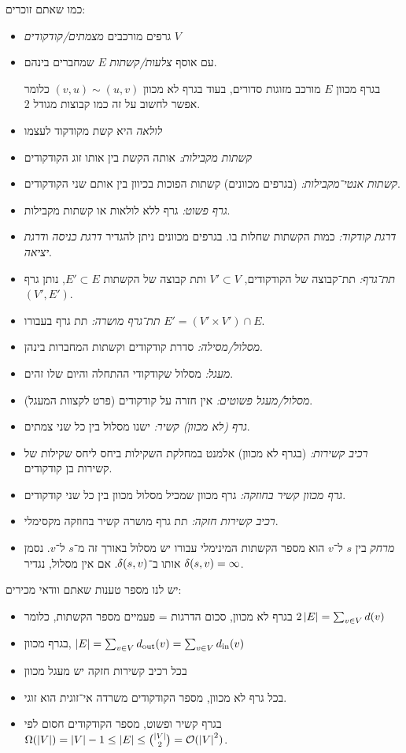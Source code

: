 \documentclass[]{../../../../tex/classes/styledArticle}
\newcommand\din{d_{\mathrm{in}}}
\newcommand\dout{d_{\mathrm{out}}}
\begin{document}
	כמו שאתם זוכרים: 
	\begin{itemize}
		\item גרפים מורכבים \textit{מצמתים/קודקודים} $V$
		\item עם אוסף \textit{צלעות/קשתות} $E$ שמחברים בינהם. 
		
		בגרף מכוון $E$ מורכב מזוגות סדורים, בעוד בגרף לא מכוון $(v, u) \sim (u, v)$ כלומר אפשר לחשוב על זה כמו קבוצות מגודל 2. 
		\item \textit{לולאה} היא קשת מקודקוד לעצמו
		\item \textit{קשתות מקבילות: }אותה הקשת בין אותו זוג הקודקודים
		\item \textit{קשתות אנטי־מקבילות: }(בגרפים מכוונים) קשתות הפוכות בכיוון בין אותם שני הקודקודים. 
		\item \textit{גרף פשוט: }גרף ללא לולאות או קשתות מקבילות. 
		\item \textit{דרגת קודקוד: }כמות הקשתות שחלות בו. בגרפים מכוונים ניתן להגדיר \textit{דרגת כניסה} ו\textit{דרגת יציאה}. 
		\item \textit{תת־גרף: }תת־קבוצה של הקודקודים, $V' \subset V$ ותת קבוצה של הקשתות $E' \subset E$, נותן גרף $(V', E')$. 
		\item \textit{תת־גרף מושרה: }תת גרף בעבורו $E' = (V' \times V') \cap E$. 
		\item \textit{מסלול/מסילה: }סדרת קודקודים וקשתות המחברות בינהן. 
		\item \textit{מעגל: }מסלול שקודקודי ההתחלה והיום שלו זהים. 
		\item \textit{מסלול/מעגל פשוטים: }אין חזרה על קודקודים (פרט לקצוות המעגל). 
		\item \textit{גרף (לא מכוון) קשיר: }ישנו מסלול בין כל שני צמתים. 
		\item \textit{רכיב קשירות: }(בגרף לא מכוון) אלמנט במחלקת השקילות ביחס ליחס שקילות של קשירות בן קודקודים. 
		\item \textit{גרף מכוון קשיר בחוזקה: }גרף מכוון שמכיל מסלול מכוון בין כל שני קודקודים. 
		\item \textit{רכיב קשירות חזקה: }תת גרף מושרה קשיר בחוזקה מקסימלי. 
		\item \textit{מרחק} בין $s$ ל־$v$ הוא מספר הקשתות המינימלי עבורו יש מסלול באורך זה מ־$s$ ל־$v$. נסמן אותו ב־$\delta(s, v)$. אם אין מסלול, נגדיר $\delta(s, v) = \infty$. 
	\end{itemize}
	
	יש לנו מספר טענות שאתם וודאי מכירים: 
	\begin{itemize}
		\item בגרף לא מכוון, סכום הדרגות = פעמיים מספר הקשתות, כלומר $2\left \lvert E \right \rvert = \sum_{v \in V}d(v)$
		\item בגרף מכוון, $\sof{E} = \sum_{v \in V}\dout(v) = \sum_{v \in V}\din(v)$
		\item בכל רכיב קשירות חזקה יש מעגל מכוון
		\item בכל גרף לא מכוון, מספר הקודקודים משרדה אי־זוגית הוא זוגי. 
		\item בגרף קשיר ופשוט, מספר הקודקודים חסום לפי $\Omega(\left \lvert V \right \rvert) = \left \lvert V \right \rvert - 1 \le \left \lvert E \right \rvert \le \binom{\left \lvert V \right \rvert}{2} = \mathcal{O}(\left \lvert V \right \rvert^{2})$. 
	\end{itemize}
	
\end{document}
